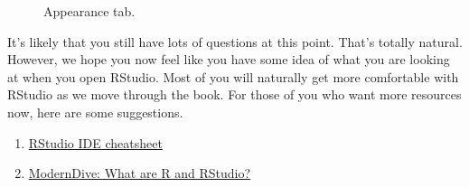 \documentclass[
  letterpaper,
  DIV=11,
  numbers=noendperiod]{scrreprt}
\begin{document}
\begin{figure}


\caption{\label{fig-preferences4}Appearance tab.}

\end{figure}%

It's likely that you still have lots of questions at this point. That's
totally natural. However, we hope you now feel like you have some idea
of what you are looking at when you open RStudio. Most of you will
naturally get more comfortable with RStudio as we move through the book.
For those of you who want more resources now, here are some suggestions.

\begin{enumerate}
\def\labelenumi{\arabic{enumi}.}
\item
  \href{https://rstudio.com/resources/cheatsheets/}{RStudio IDE
  cheatsheet}
\item
  \href{https://moderndive.com/1-getting-started.html\#r-rstudio}{ModernDive:
  What are R and RStudio?}
\end{enumerate}
\end{document}
